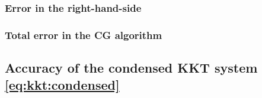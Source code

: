 \subsubsection{Error in the right-hand-side}


\subsubsection{Total error in the CG algorithm}


\subsection{Accuracy of the condensed KKT system \eqref{eq:kkt:condensed}}

